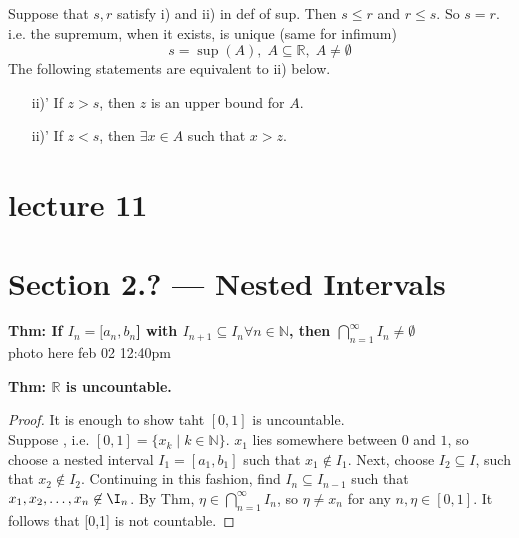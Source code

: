 \documentclass{report}
\newcommand{\N}{\mathbb{N}}  %
\newcommand{\R}{\mathbb{R}}  %
\theoremstyle{mystyle}
\theoremstyle{customtheorem}
\begin{document}
    Suppose that $s,r$ satisfy i) and ii) in def of sup. Then $s \leq r$ and $r \leq s$. So $s=r$.\\
    i.e. the supremum, when it exists, is unique (same for infimum)
    \[s=\sup(A), \;A \subseteq \R,\; A \neq \emptyset \]
    The following statements are equivalent to ii) below. \vspace{-1em} \begin{enumerate}
        \item[ii)'] If $z>s$, then $z$ is  an upper bound for $A$.
        \item[ii)'] If $z < s$, then $\exists x \in A$ such that $x>z$.
    \end{enumerate}

    \pagebreak

    \section*{lecture 11}
    \section*{Section 2.? --- Nested Intervals}
    \textbf{Thm: If $I_n=[a_n,b_n$] with $I_{n+1}\subseteq I_n \forall n \in \N$, then $\bigcap_{n=1}^{\infty} I_n \neq \emptyset$} \\
    photo here feb 02 12:40pm


    \textbf{Thm: $\R$ is uncountable.}
    \begin{proof}
        It is enough to show taht $[0,1]$ is uncountable.\\
        Suppose , i.e. $[0,1]=\{x_k \mid k \in \N\}$. $x_1$ lies somewhere between $0$ and $1$, so choose a nested interval $I_1=[a_1,b_1]$ such that $x_1 \not \in I_1$. Next, choose $I_2 \subseteq I$, such that $x_2 \not \in I_2$. Continuing in this fashion, find $I_n\subseteq I_{n-1}$ such that $x_1, x_2, \ldots, x_n\not\in\I_n$. By Thm, $\eta \in \bigcap_{n=1}^\infty I_n$, so $\eta \neq x_n$ for any $n, \eta\in [0,1]$. It follows that [0,1] is not countable.
    \end{proof}
\end{document}

